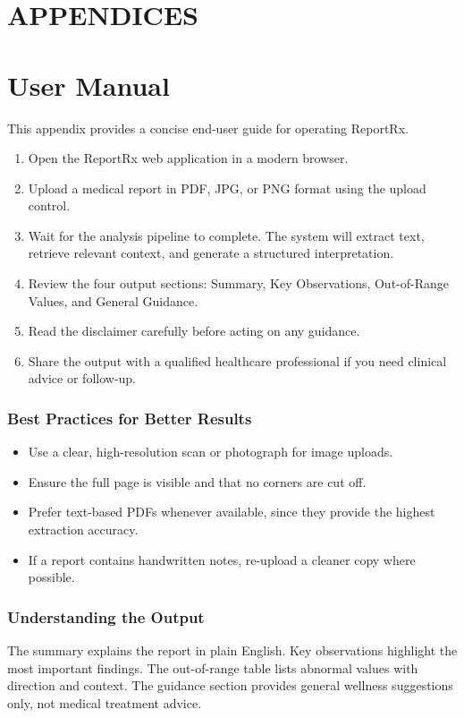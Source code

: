 \documentclass[12pt,a4paper]{report}
\begin{document}
\chapter*{APPENDICES}

\chapter{User Manual}
This appendix provides a concise end-user guide for operating ReportRx.

\begin{enumerate}
    \item Open the ReportRx web application in a modern browser.
    \item Upload a medical report in PDF, JPG, or PNG format using the upload control.
    \item Wait for the analysis pipeline to complete. The system will extract text, retrieve relevant context, and generate a structured interpretation.
    \item Review the four output sections: Summary, Key Observations, Out-of-Range Values, and General Guidance.
    \item Read the disclaimer carefully before acting on any guidance.
    \item Share the output with a qualified healthcare professional if you need clinical advice or follow-up.
\end{enumerate}

\subsection{Best Practices for Better Results}
\begin{itemize}
    \item Use a clear, high-resolution scan or photograph for image uploads.
    \item Ensure the full page is visible and that no corners are cut off.
    \item Prefer text-based PDFs whenever available, since they provide the highest extraction accuracy.
    \item If a report contains handwritten notes, re-upload a cleaner copy where possible.
\end{itemize}

\subsection{Understanding the Output}
The summary explains the report in plain English. Key observations highlight the most important findings. The out-of-range table lists abnormal values with direction and context. The guidance section provides general wellness suggestions only, not medical treatment advice.
\end{document}
